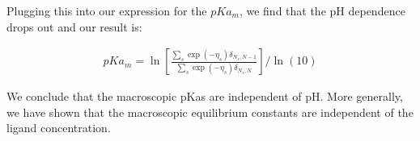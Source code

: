 Plugging this into our expression for the $pKa_m$, we find that the pH
dependence drops out and our result is:

\begin{align*}
  pKa_m = \ln \left[ \frac{\sum_s \exp(-\eta_s) \delta_{N_s,N-1}}{\sum_s \exp(- \eta_s) \delta_{N_s,N}} \right] / \ln(10)
\end{align*}

We conclude that the macroscopic pKas are independent of pH. More
generally, we have shown that the macroscopic equilibrium constants
are independent of the ligand concentration.
